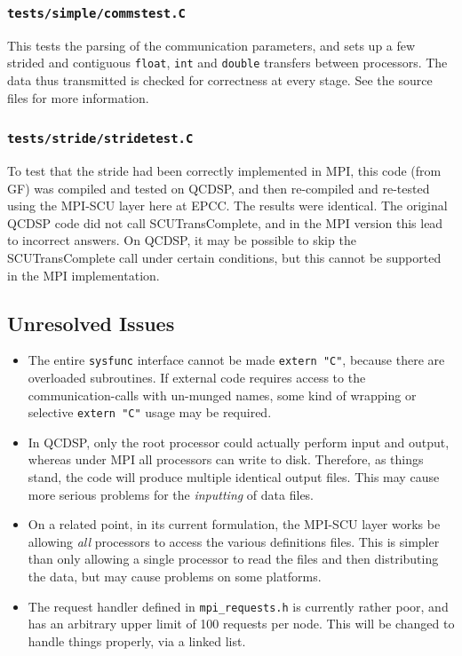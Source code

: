 \documentclass[12pt]{article}
\newcommand{\cde}[1]{{\tt #1}}            %
\begin{document}
\subsubsection{\cde{tests/simple/commstest.C}}
This tests the parsing of the communication parameters, and sets up a
few strided and contiguous \cde{float}, \cde{int} and \cde{double}
transfers between processors.  The data thus transmitted is checked
for correctness at every stage.  See the source files for more
information.

\subsubsection{\cde{tests/stride/stridetest.C}}
To test that the stride had been correctly implemented in MPI, this
code (from GF) was compiled and tested on QCDSP, and then re-compiled
and re-tested using the MPI-SCU layer here at EPCC.  The results were
identical.  The original QCDSP code did not call SCUTransComplete, and
in the MPI version this lead to incorrect answers.  On QCDSP, it may
be possible to skip the SCUTransComplete call under certain
conditions, but this cannot be supported in the MPI implementation.

\subsection{Unresolved Issues}
\begin{itemize}
\item The entire \cde{sysfunc} interface cannot be made \cde{extern
"C"}, because there are overloaded subroutines.  If external code
requires access to the communication-calls with un-munged names, some
kind of wrapping or selective \cde{extern "C"} usage may be required.

\item In QCDSP, only the root processor could actually perform input
and output, whereas under MPI all processors can write to disk.
Therefore, as things stand, the code will produce multiple identical
output files.  This may cause more serious problems for
the \emph{inputting} of data files.

\item On a related point, in its current formulation, the MPI-SCU
layer works be allowing \emph{all} processors to access the various
definitions files.  This is simpler than only allowing a single
processor to read the files and then distributing the data, but may
cause problems on some platforms.

\item The request handler defined in \cde{mpi\_requests.h} is
currently rather poor, and has an arbitrary upper limit of 100
requests per node.  This will be changed to handle things properly,
via a linked list.
\end{itemize}
\end{document}
